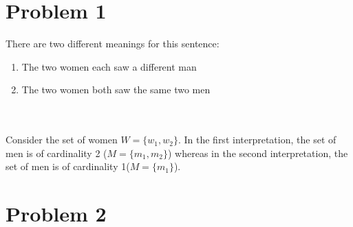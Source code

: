 \documentclass{article}%
\begin{document}
\section*{Problem 1}


There are two different meanings for this sentence:
\begin{enumerate}
    \item The two women each saw a different man
    \item The two women both saw the same two men
\end{enumerate}\\
\\
Consider the set of women $W = \{w_1, w_2\}$. In the first interpretation, the set of men
is of cardinality 2 ($M = \{m_1, m_2\}$) whereas in the second interpretation, the set of men is of
cardinality 1($M = \{m_1\}$).

\section*{Problem 2}

\end{document}
